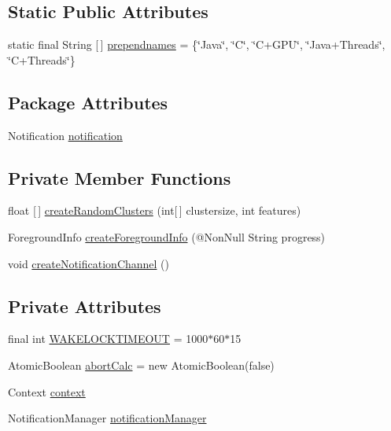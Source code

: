 \subsection*{Static Public Attributes}
\begin{DoxyCompactItemize}
\item 
static final String \mbox{[}$\,$\mbox{]} \mbox{\hyperlink{classcom_1_1example_1_1dmocl_1_1dataminingtask_a27dbb6b1fb48631844198bfc5ceea344}{prependnames}} = \{\char`\"{}Java\char`\"{}, \char`\"{}C\char`\"{}, \char`\"{}C+G\+PU\char`\"{}, \char`\"{}Java+Threads\char`\"{}, \char`\"{}C+Threads\char`\"{}\}
\end{DoxyCompactItemize}
\subsection*{Package Attributes}
\begin{DoxyCompactItemize}
\item 
Notification \mbox{\hyperlink{classcom_1_1example_1_1dmocl_1_1dataminingtask_ab464d8aecaa30a1a86dead20630500e0}{notification}}
\end{DoxyCompactItemize}
\subsection*{Private Member Functions}
\begin{DoxyCompactItemize}
\item 
float \mbox{[}$\,$\mbox{]} \mbox{\hyperlink{classcom_1_1example_1_1dmocl_1_1dataminingtask_ae00da243105d11a967152ac0beee0f98}{create\+Random\+Clusters}} (int\mbox{[}$\,$\mbox{]} clustersize, int features)
\item 
Foreground\+Info \mbox{\hyperlink{classcom_1_1example_1_1dmocl_1_1dataminingtask_a9889676d4e29bae3a9b568eedf13af7e}{create\+Foreground\+Info}} (@Non\+Null String progress)
\item 
void \mbox{\hyperlink{classcom_1_1example_1_1dmocl_1_1dataminingtask_a33a8f987259a1d981e0274f02b73c1e2}{create\+Notification\+Channel}} ()
\end{DoxyCompactItemize}
\subsection*{Private Attributes}
\begin{DoxyCompactItemize}
\item 
final int \mbox{\hyperlink{classcom_1_1example_1_1dmocl_1_1dataminingtask_ae356504b8e0f77272b98f34e394a32ab}{W\+A\+K\+E\+L\+O\+C\+K\+T\+I\+M\+E\+O\+UT}} = 1000$\ast$60$\ast$15
\item 
Atomic\+Boolean \mbox{\hyperlink{classcom_1_1example_1_1dmocl_1_1dataminingtask_a0b386c5618f0f8de9730e0fd1cf7fd1c}{abort\+Calc}} = new Atomic\+Boolean(false)
\item 
Context \mbox{\hyperlink{classcom_1_1example_1_1dmocl_1_1dataminingtask_af92eb0e81bab3e6a23945fb18165b423}{context}}
\item 
Notification\+Manager \mbox{\hyperlink{classcom_1_1example_1_1dmocl_1_1dataminingtask_afb4f04a0d899dbec207f35e69f5569c9}{notification\+Manager}}
\end{DoxyCompactItemize}


